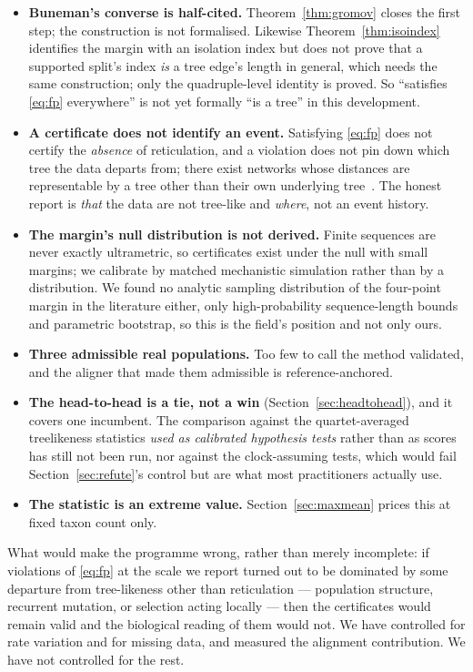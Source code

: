 \documentclass[11pt,a4paper]{article}
\theoremstyle{definition}
\theoremstyle{remark}
\begin{document}
\begin{itemize}
\item \textbf{Buneman's converse is half-cited.} Theorem~\ref{thm:gromov} closes
the first step; the construction is not formalised. Likewise
Theorem~\ref{thm:isoindex} identifies the margin with an isolation index but
does not prove that a supported split's index \emph{is} a tree edge's length in
general, which needs the same construction; only the quadruple-level identity is
proved. So ``satisfies \eqref{eq:fp}
everywhere'' is not yet formally ``is a tree'' in this development.
\item \textbf{A certificate does not identify an event.} Satisfying \eqref{eq:fp}
does not certify the \emph{absence} of reticulation, and a violation does not
pin down which tree the data departs from; there exist networks whose distances
are representable by a tree other than their own underlying
tree~\cite{francissteel}. The honest report is \emph{that} the data are not
tree-like and \emph{where}, not an event history.
\item \textbf{The margin's null distribution is not derived.} Finite sequences
are never exactly ultrametric, so certificates exist under the null with small
margins; we calibrate by matched mechanistic simulation rather than by a
distribution. We found no analytic sampling distribution of the four-point margin
in the literature either, only high-probability sequence-length bounds and
parametric bootstrap, so this is the field's position and not only ours.
\item \textbf{Three admissible real populations.} Too few to call the method
validated, and the aligner that made them admissible is reference-anchored.
\item \textbf{The head-to-head is a tie, not a win}
(Section~\ref{sec:headtohead}), and it covers one incumbent. The comparison
against the quartet-averaged treelikeness statistics \emph{used as calibrated
hypothesis tests} rather than as scores has still not been run, nor against the
clock-assuming tests, which would fail Section~\ref{sec:refute}'s control but
are what most practitioners actually use.
\item \textbf{The statistic is an extreme value.} Section~\ref{sec:maxmean}
prices this at fixed taxon count only.
\end{itemize}

What would make the programme wrong, rather than merely incomplete: if
violations of \eqref{eq:fp} at the scale we report turned out to be dominated by
some departure from tree-likeness other than reticulation --- population
structure, recurrent mutation, or selection acting locally --- then the
certificates would remain valid and the biological reading of them would not. We
have controlled for rate variation and for missing data, and measured the
alignment contribution. We have not controlled for the rest.
\end{document}
